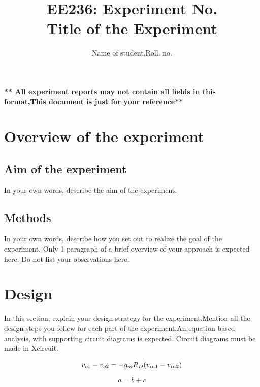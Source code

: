 \documentclass[12pt]{article}
\title{EE236: Experiment No.\\
Title of the Experiment}
\author{Name of student,Roll. no.}
\begin{document}
\maketitle

\textbf{ ** All experiment reports may not contain all fields in this format,This document is just for your reference**} 

\section{Overview of the experiment} %

\subsection{Aim of the experiment}%

In your own words, describe the aim of the experiment.

\subsection{Methods}




In your own words, describe how you set out to realize the goal of the experiment. Only 1 paragraph of a brief overview of your approach is expected here. Do not list your observations here.

\section{Design}%

In this section, explain your design strategy for the experiment.Mention all the design steps you follow for each part of the experiment.An equation based analysis, with supporting circuit diagrams is expected. Circuit diagrams must be made in Xcircuit.
 
 \begin{equation}
     v_{o1}-v_{o2}
     \newline
     = -g_mR_D(v_{in1}-v_{in2})
 \end{equation}     
 
 \begin{equation}
     a=b+c
 \end{equation}     
\end{document}
